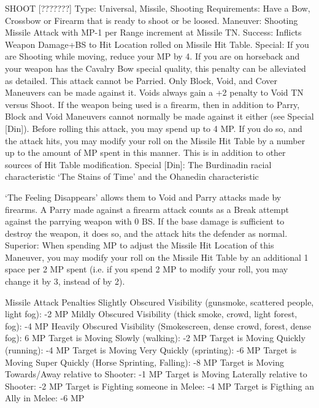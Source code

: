 \documentclass[oneside,11pt,english]{book}
\begin{document}
 

SHOOT [???????] 
Type: Universal, Missile, Shooting 
Requirements: Have a Bow, Crossbow or Firearm that is ready to shoot or be loosed. 
Maneuver: Shooting Missile Attack with MP-1 per Range increment at Missile TN. 
Success: Inflicts Weapon Damage+BS to Hit Location rolled on Missile Hit Table. 
Special: If you are Shooting while moving, reduce your MP by 4. If you are on horseback and your 
weapon has the Cavalry Bow special quality, this penalty can be alleviated as detailed. 
This attack cannot be Parried. Only Block, Void, and Cover Maneuvers can be made against it. 
Voids always gain a +2 penalty to Void TN versus Shoot. 
If the weapon being used is a firearm, then in addition to Parry, Block and Void Maneuvers cannot 
normally be made against it either (see Special [Din]). 
Before rolling this attack, you may spend up to 4 MP. If you do so, and the attack hits, you may modify 
your roll on the Missile Hit Table by a number up to the amount of MP spent in this manner. This is in 
addition to other sources of Hit Table modification. 
Special [Din]: The Burdinadin racial characteristic ‘The Stains of Time’ and the Ohanedin characteristic 


‘The Feeling Disappears’ allows them to Void and Parry attacks made by firearms. A Parry made against 
a firearm attack counts as a Break attempt against the parrying weapon with 0 BS. If the base damage is 
sufficient to destroy the weapon, it does so, and the attack hits the defender as normal. 
Superior: When spending MP to adjust the Missile Hit Location of this Maneuver, you may modify your 
roll on the Missile Hit Table by an additional 1 space per 2 MP spent (i.e. if you spend 2 MP to modify 
your roll, you may change it by 3, instead of by 2). 

 

Missile Attack Penalties 
Slightly Obscured Visibility (gunsmoke, scattered people, light fog): -2 MP 
Mildly Obscured Visibility (thick smoke, crowd, light forest, fog): -4 MP 
Heavily Obscured Visibility (Smokescreen, dense crowd, forest, dense fog): 6 MP 
Target is Moving Slowly (walking): -2 MP 
Target is Moving Quickly (running): -4 MP 
Target is Moving Very Quickly (sprinting): -6 MP 
Target is Moving Super Quickly (Horse Sprinting, Falling): -8 MP 
Target is Moving Towards/Away relative to Shooter: -1 MP 
Target is Moving Laterally relative to Shooter: -2 MP 
Target is Fighting someone in Melee: -4 MP 
Target is Figthing an Ally in Melee: -6 MP 

 
\end{document}
